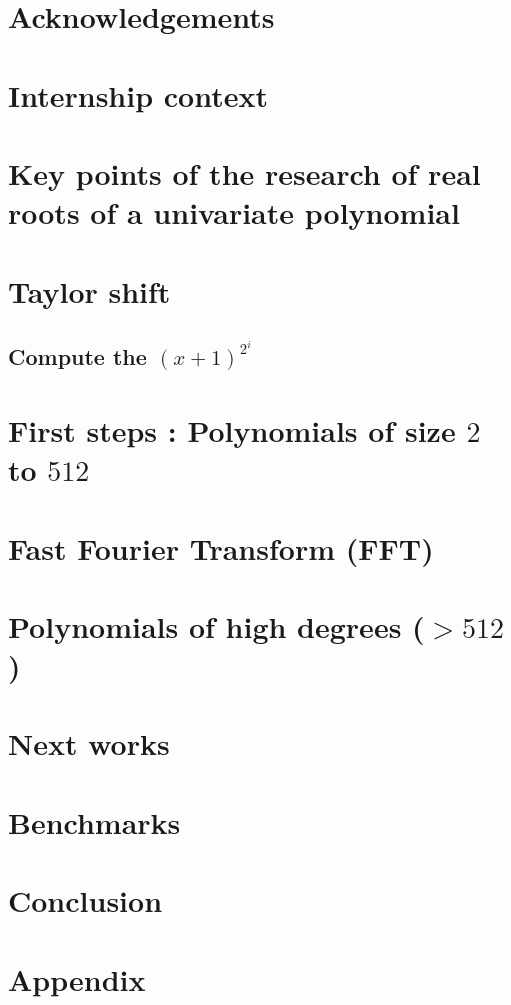 \documentclass[10pt]{report}
\begin{document}

\newpage
\section*{Acknowledgements}


\renewcommand{\contentsname}{Contents}
\renewcommand{\bibname}{References}
\tableofcontents




\newpage
\section{Internship context}


\newpage
\section{Key points of the research of real roots of a univariate polynomial}



\newpage
\section{Taylor shift}


\subsection{Compute the $(x+1)^{2^i}$}


\newpage
\section{First steps : Polynomials of size $2$ to $512$}


\newpage
\section{Fast Fourier Transform (FFT)}


\newpage
\section{Polynomials of high degrees ($> 512$)}


\newpage
\section{Next works}


\newpage
\section{Benchmarks}


\newpage
\section{Conclusion}


\newpage
\section{Appendix}


\newpage
\nocite{*}


\end{document}
